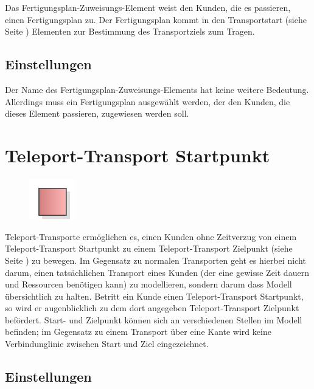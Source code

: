 Das Fertigungsplan-Zuweisungs-Element weist den Kunden, die es passieren, einen Fertigungsplan zu.
Der Fertigungsplan kommt in den Transportstart (siehe Seite \pageref{ref:ModelElementTransportSource}) 
Elementen zur Bestimmung des Transportziels zum Tragen.

\subsection*{Einstellungen}

Der Name des Fertigungsplan-Zuweisungs-Elements hat keine weitere Bedeutung. Allerdings muss ein Fertigungsplan
ausgewählt werden, der den Kunden, die dieses Element passieren, zugewiesen werden soll.


\section{Teleport-Transport Startpunkt}
\label{ref:ModelElementTeleportSource}

\begin{figure}
\vspace{-22pt}
\includegraphics[width=2cm]{imageModelElementTeleportSource.png}
\vspace{-22pt}
\end{figure}

Teleport-Transporte ermöglichen es, einen Kunden ohne Zeitverzug
von einem Teleport-Transport Startpunkt zu einem 
Teleport-Transport Zielpunkt (siehe Seite \pageref{ref:ModelElementTeleportDestination}) 
zu bewegen. Im Gegensatz zu normalen Transporten geht es hierbei nicht darum,
einen tatsächlichen Transport eines Kunden (der eine gewisse Zeit dauern und
Ressourcen benötigen kann) zu modellieren, sondern darum dass Modell übersichtlich
zu halten. Betritt ein Kunde einen Teleport-Transport Startpunkt, so wird er
augenblicklich zu dem dort angegeben Teleport-Transport Zielpunkt befördert.
Start- und Zielpunkt können sich an verschiedenen Stellen im Modell befinden;
im Gegensatz zu einem Transport über eine Kante wird keine Verbindunglinie
zwischen Start und Ziel eingezeichnet.

\subsection*{Einstellungen}

